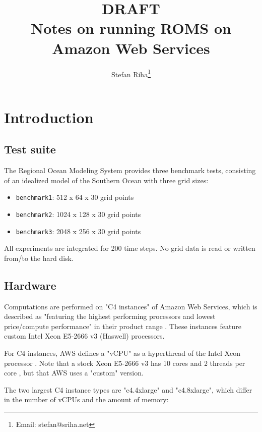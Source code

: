 \documentclass[12pt,a4paper]{article}
\title{
	{\bf DRAFT}\\
	Notes on running ROMS on Amazon Web Services 
}
\author{Stefan Riha\thanks{Email: stefan@sriha.net}}
\begin{document}
	\setlength{\parindent}{0cm}
	\maketitle
	
\section{Introduction}

\subsection{Test suite}

The Regional Ocean Modeling System \citep[ROMS, see ][]{shchepetkin2005regional} provides three benchmark tests, consisting of 
an idealized model of the Southern Ocean with three grid sizes:

\begin{itemize}
	\item \verb|benchmark1|:   512 x 64 x 30 grid points
	\item \verb|benchmark2|:   1024 x 128 x 30 grid points
	\item \verb|benchmark3|:   2048 x 256 x 30 grid points
\end{itemize}

All experiments are integrated for 200 time steps. No grid data is read or written from/to the hard disk.

\subsection{Hardware}


Computations are performed on "C4 instances" of Amazon Web Services, which is described as "featuring the highest performing processors and lowest price/compute performance" in their product range . These instances feature custom Intel Xeon E5-2666 v3 (Haswell) processors.

For C4 instances, AWS defines a "vCPU" as a hyperthread of the Intel Xeon processor . Note that a stock Xeon E5-2666 v3 has 10 cores and 2 threads per core \citep{web:intelXeon}, but that AWS uses a "custom" version.

The two largest C4 instance types are "c4.4xlarge" and  "c4.8xlarge", which differ in the number of vCPUs and the amount of memory:
\end{document}
